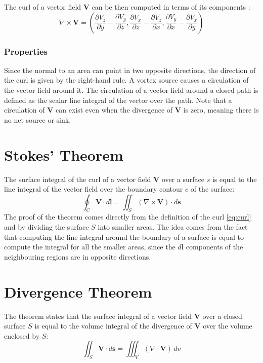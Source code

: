 The curl of a vector field \(\mathbf{V}\) can be then computed in terms of its components \cite{math-book}:
\begin{equation}
\nabla \times \mathbf{V} = \left( \frac{\partial V_z}{\partial y} - \frac{\partial V_y}{\partial z}, \frac{\partial V_x}{\partial z} - \frac{\partial V_z}{\partial x}, \frac{\partial V_y}{\partial x} - \frac{\partial V_x}{\partial y} \right)
\end{equation}

\subsubsection{Properties}
Since the normal to an area can point in two opposite directions, the direction of the curl is given by the right-hand rule.
A vortex source causes a circulation of the vector field around it. The circulation of a vector field around a closed path is defined as the scalar line integral of the vector over the path. Note that a circulation of \(\mathbf{V}\) can exist even when the divergence of \(\mathbf{V}\) is zero, meaning there is no net source or sink.

\section{Stokes' Theorem} \label{Stokes' Theorem}
The surface integral of the curl of a vector field \(\mathbf{V}\) over a surface \( s \) is equal to the line integral of the vector field over the boundary contour \( c \) of the surface:
\begin{equation}
\oint_C \mathbf{V} \cdot d\mathbf{l} = \iint_S (\nabla \times \mathbf{V}) \cdot d\mathbf{s}
\label{eq:stokes}
\end{equation}
The proof of the theorem comes directly from the definition of the curl \ref{eq:curl} and by dividing the surface $S$ into smaller areas. The idea comes from the fact that computing the line integral around the boundary of a surface is equal to compute the integral for all the smaller areas, since the \(d\mathbf{l}\) components of the neighbouring regions are in opposite directions.

\section{Divergence Theorem}
 The theorem states that the surface integral of a vector field \(\mathbf{V}\) over a closed surface \(S\) is equal to the volume integral of the divergence of \(\mathbf{V}\) over the volume enclosed by \(S\):
\begin{equation}
    \iint_S\mathbf{V} \cdot d\mathbf{s} = \iiint_V (\nabla \cdot \mathbf{V}) \, dv
    \label{eq:divergence}
\end{equation}

